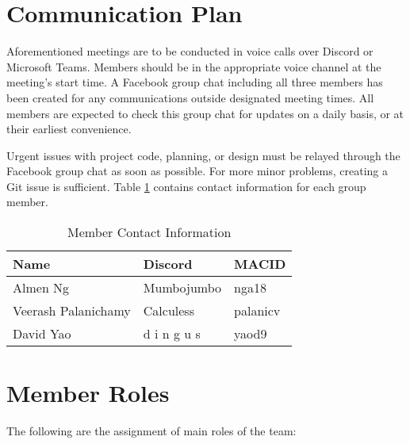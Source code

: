 \documentclass[12pt,letterpaper]{article}
\begin{document}
\section{Communication Plan}
Aforementioned meetings are to be conducted in voice calls over Discord or Microsoft Teams. Members should be in the appropriate voice channel at the meeting's start time. A Facebook group chat including all three members has been created for any communications outside designated meeting times. All members are expected to check this group chat for updates on a daily basis, or at their earliest convenience.

Urgent issues with project code, planning, or design must be relayed through the Facebook group chat as soon as possible. For more minor problems, creating a Git issue is sufficient. Table \ref{tab:teamContacts} contains contact information for each group member.

\begin{table}[ht]
\begin{tabularx}{\textwidth}{|l|l|X|}
\toprule
\textbf{Name} & \textbf{Discord} & \textbf{MACID}\\
\midrule
Almen Ng                & Mumbojumbo    & nga18\\
Veerash Palanichamy     & Calculess     & palanicv\\
David Yao               & d i n g u s   & yaod9\\
\bottomrule
\end{tabularx}
\caption{Member Contact Information} \label{tab:teamContacts}
\end{table}

\section{Member Roles}
The following are the assignment of main roles of the team:
\end{document}
